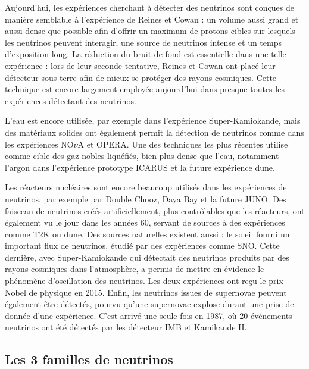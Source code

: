 		    Aujourd'hui, les expériences cherchant à détecter des neutrinos sont conçues de manière semblable à l'expérience de Reines et Cowan : un volume aussi grand et aussi dense que possible afin d'offrir un maximum de protons cibles sur lesquels les neutrinos  peuvent interagir, une source de neutrinos intense et un temps d'exposition long. La réduction du bruit de fond est essentielle dans une telle expérience : lors de leur seconde tentative, Reines et Cowan ont placé leur détecteur sous terre afin de mieux se protéger des rayons cosmiques. Cette technique est encore largement employée aujourd'hui dans presque toutes les expériences détectant des neutrinos.
		    
		    L'eau est encore utilisée, par exemple dans l'expérience Super-Kamiokande\cite{Fukuda1998}, mais des matériaux solides ont également permit la détection de neutrinos comme dans les expériences NO$\nu$A\cite{Adamson2016} et OPERA\cite{Agafonova2018}. Une des techniques les plus récentes utilise comme cible des gaz nobles liquéfiés, bien plus dense que l'eau, notamment l'argon dans l'expérience prototype ICARUS\cite{Amerio2004} et la future expérience \gls{dune}\cite{Acciarri2016a}. 
		    
		    Les réacteurs nucléaires sont encore beaucoup utilisés dans les expériences de neutrinos, par exemple par Double Chooz\cite{Crespo-Anadon2014}, Daya Bay\cite{An2014} et la future JUNO\cite{An2015}. Des faisceau de neutrinos créés artificiellement, plus contrôlables que les réacteurs, ont également vu le jour dans les années 60, servant de sources à des expériences comme T2K\cite{Abe2018} ou \gls{dune}\cite{Strait2016}. Des sources naturelles existent aussi : le soleil fourni un important flux de neutrinos, étudié par des expériences comme SNO\cite{Aharmim2013}. Cette dernière, avec Super-Kamiokande\cite{Fukuda1998} qui détectait des neutrinos produits par des rayons cosmiques dans l'atmosphère, a permis de mettre en évidence le phénomène d'oscillation des neutrinos. Les deux expériences ont reçu le prix Nobel de physique en 2015. Enfin, les neutrinos issues de supernovae peuvent également être détectés, pourvu qu'une supernovae explose durant une prise de donnée d'une expérience. C'est arrivé une seule fois en 1987, où 20 événements neutrinos ont été détectés par les détecteur IMB et Kamikande II\cite{Hirata1987}.

		\subsection{Les 3 familles de neutrinos}
		
